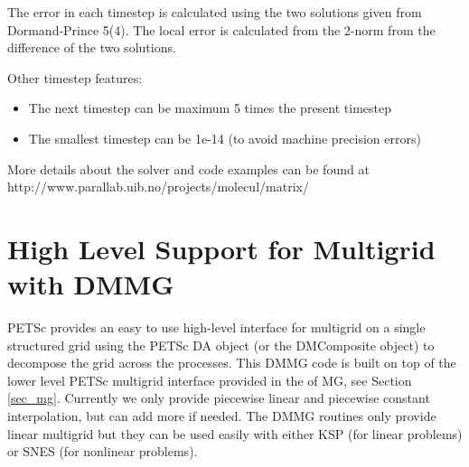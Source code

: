 The error in each timestep is calculated using the two solutions given
from Dormand-Prince 5(4). The local error is calculated from the
2-norm from the difference of the two solutions.

Other timestep features:
\begin{itemize}
  \item The next timestep can be maximum 5 times the present timestep
  \item The smallest timestep can be 1e-14 (to avoid machine precision
  errors)
\end{itemize}

More details about the solver and code examples can be found at
http://www.parallab.uib.no/projects/molecul/matrix/


\cleardoublepage
\chapter{High Level Support for Multigrid with DMMG}
\label{chapter_dmmg}

PETSc provides an easy to use high-level interface for multigrid on a
single structured grid using the PETSc DA object (or the DMComposite
object) to decompose the grid across the processes.  This DMMG code
 is built on top of the lower level PETSc multigrid
interface provided in the  of MG, see Section
\ref{sec_mg}. Currently we only provide piecewise linear and piecewise
constant interpolation, but can add more if needed. The DMMG routines
only provide linear multigrid but they can be used easily with either
KSP (for linear problems) or SNES (for nonlinear problems).

